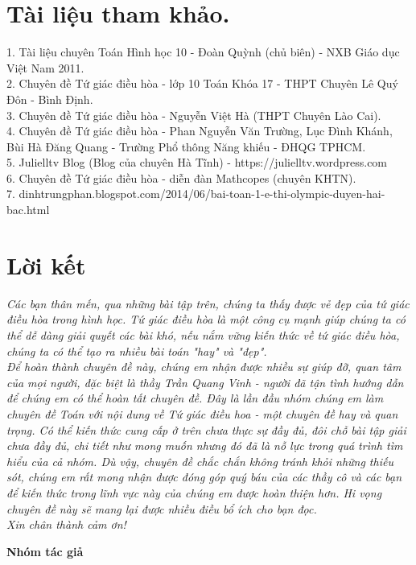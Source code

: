 \documentclass[12pt,a4paper]{article}
\begin{document}
\section{Tài liệu tham khảo.}
1. Tài liệu chuyên Toán Hình học 10 - Đoàn Quỳnh (chủ biên) - NXB Giáo dục Việt Nam 2011.\\
2. Chuyên đề Tứ giác điều hòa - lớp 10 Toán Khóa 17 - THPT Chuyên Lê Quý Đôn - Bình Định.\\
3. Chuyên đề Tứ giác điều hòa - Nguyễn Việt Hà (THPT Chuyên Lào Cai).\\
4. Chuyên đề Tứ giác điều hòa - Phan Nguyễn Văn Trường, Lục Đình Khánh, Bùi Hà Đăng Quang - Trường Phổ thông Năng khiếu - ĐHQG TPHCM.\\
5. Julielltv Blog (Blog của chuyên Hà Tĩnh) - https://julielltv.wordpress.com\\
6. Chuyên đề Tứ giác điều hòa - diễn đàn Mathcopes (chuyên KHTN).\\
7. dinhtrungphan.blogspot.com/2014/06/bai-toan-1-e-thi-olympic-duyen-hai-bac.html
\newpage
\section{Lời kết}
\textit{Các bạn thân mến, qua những bài tập trên, chúng ta thấy được vẻ đẹp của tứ giác điều hòa trong hình học. Tứ giác điều hòa là một công cụ mạnh giúp chúng ta có thể dễ dàng giải quyết các bài khó, nếu nắm vững kiến thức về tứ giác điều hòa, chúng ta có thể tạo ra nhiều bài toán "hay" và "đẹp".\\
Để hoàn thành chuyên đề này, chúng em nhận được nhiều sự giúp đỡ, quan tâm của mọi người, đặc biệt là thầy Trần Quang Vinh - người đã tận tình hướng dẫn để chúng em có thể hoàn tất chuyên đề. Đây là lần đầu nhóm chúng em làm chuyên đề Toán với nội dung về Tứ giác điều hoa - một chuyên đề hay và quan trọng. Có thể kiến thức cung cấp ở trên chưa thực sự đầy đủ, đôi chỗ bài tập giải chưa đầy đủ, chi tiết như mong muốn nhưng đó đã là nỗ lực trong quá trình tìm hiểu của cả nhóm. Dù vậy, chuyên đề chắc chắn không tránh khỏi những thiếu sót, chúng em rất mong nhận được đóng góp quý báu của các thầy cô và các bạn để kiến thức trong lĩnh vực này của chúng em được hoàn thiện hơn. Hi vọng chuyên đề này sẽ mang lại được nhiều điều bổ ích cho bạn đọc.\\
Xin chân thành cảm ơn!}\\
\begin{flushright}
\textbf{Nhóm tác giả}
\end{flushright}
\end{document}

